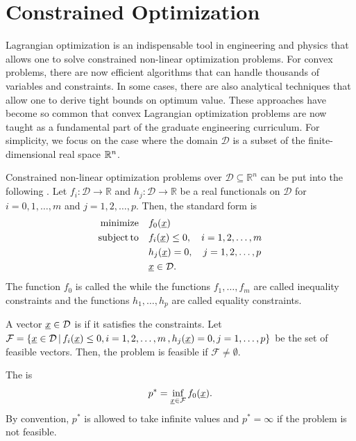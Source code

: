 \section{Constrained Optimization}
\label{sec:constrained_optimization}

Lagrangian optimization is an indispensable tool in engineering and physics that allows one to solve constrained non-linear optimization problems.
For convex problems, there are now efficient algorithms that can handle thousands of variables and constraints.
In some cases, there are also analytical techniques that allow one to derive tight bounds on optimum value.
These approaches have become so common that convex Lagrangian optimization problems are now taught as a fundamental part of the graduate engineering curriculum.
For simplicity, we focus on the case where the domain $\mathcal{D}$ is a subset of the finite-dimensional real space $\mathbb{R}^n$.

Constrained non-linear optimization problems over $\mathcal{D} \subseteq \mathbb{R}^n$ can be put into the following .
Let $f_i \colon \mathcal{D} \rightarrow \mathbb{R}$ and $h_j \colon \mathcal{D} \rightarrow \mathbb{R}$ be a real functionals on $\mathcal{D}$ for $i=0,1,\ldots,m$ and $j=1,2,\ldots,p$.
Then, the standard form is
\begin{align*}
\mathrm{minimize} \quad & f_0 (\underline{x}) \\
\mathrm{subject\,to} \quad & f_i (\underline{x}) \leq 0, \quad i=1,2,\ldots,m \\
& h_j (\underline{x}) = 0, \quad j=1,2,\ldots,p \\
& \underline{x} \in \mathcal{D}.
\end{align*}
The function $f_0$ is called the  while the functions $f_1,\ldots,f_m$ are called inequality constraints and the functions $h_1,\ldots,h_p$ are called equality constraints.

\begin{definition}
A vector $\underline{x} \in \mathcal{D}$ is  if it satisfies the constraints.
Let $\mathcal{F} = \{ \underline{x} \in \mathcal{D} \, | \,  f_i (\underline{x}) \leq 0, i=1,2,\ldots,m \, , h_j (\underline{x}) = 0, j=1,\ldots,p \}$ be the set of feasible vectors.
Then, the problem is feasible if $\mathcal{F} \neq \emptyset$.
\end{definition}

\begin{definition}
The  is
\[ p^* = \inf_{\underline{x} \in \mathcal{F}} f_0 (\underline{x}). \]
By convention, $p^*$ is allowed to take infinite values and $p^* = \infty$ if the problem is not feasible.
\end{definition}

